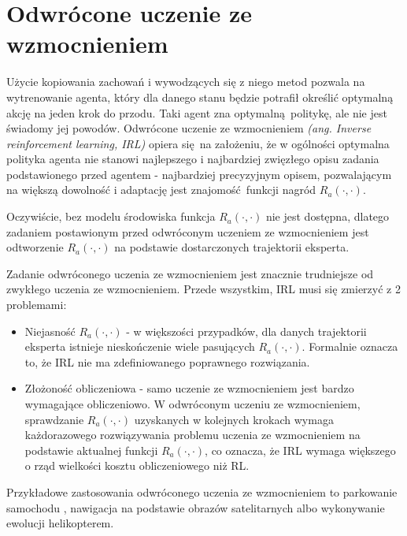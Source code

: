 \section{Odwrócone uczenie ze wzmocnieniem}
Użycie kopiowania zachowań i wywodzących się z niego metod pozwala na wytrenowanie agenta, który dla danego stanu będzie potrafił określić optymalną akcję na jeden krok do przodu. Taki agent zna optymalną politykę, ale nie jest świadomy jej powodów. Odwrócone uczenie ze wzmocnieniem  \textit{(ang. Inverse reinforcement learning, IRL)} opiera się na założeniu, że w ogólności optymalna polityka agenta nie stanowi najlepszego i najbardziej zwięzłego opisu zadania podstawionego przed agentem - najbardziej precyzyjnym opisem, pozwalającym na większą dowolność i adaptację jest znajomość funkcji nagród $R_a(\cdot,\cdot)$.

Oczywiście, bez modelu środowiska funkcja $R_a(\cdot,\cdot)$ nie jest dostępna, dlatego zadaniem postawionym przed odwróconym uczeniem ze wzmocnieniem jest odtworzenie $R_a(\cdot,\cdot)$ na podstawie dostarczonych trajektorii eksperta.

Zadanie odwróconego uczenia ze wzmocnieniem jest znacznie trudniejsze od zwykłego uczenia ze wzmocnieniem. Przede wszystkim, IRL musi się zmierzyć z 2 problemami:

\begin{itemize}
\item Niejasność $R_a(\cdot,\cdot)$ - w większości przypadków, dla danych trajektorii eksperta istnieje nieskończenie wiele pasujących $R_a(\cdot,\cdot)$. Formalnie oznacza to, że IRL nie ma zdefiniowanego poprawnego rozwiązania.
\item Złożoność obliczeniowa - samo uczenie ze wzmocnieniem jest bardzo wymagające obliczeniowo. W odwróconym uczeniu ze wzmocnieniem, sprawdzanie $R_a(\cdot,\cdot)$ uzyskanych w kolejnych krokach wymaga każdorazowego rozwiązywania problemu uczenia ze wzmocnieniem na podstawie aktualnej funkcji $R_a(\cdot,\cdot)$, co oznacza, że IRL wymaga większego o rząd wielkości kosztu obliczeniowego niż RL.
\end{itemize}

Przykładowe zastosowania odwróconego uczenia ze wzmocnieniem to parkowanie samochodu \cite{DBLP:conf/iros/AbbeelDNT08}, nawigacja na podstawie obrazów satelitarnych \cite{Ratliff:2006:MMP:1143844.1143936} albo wykonywanie ewolucji helikopterem\cite{DBLP:journals/cacm/CoatesAN09}.


